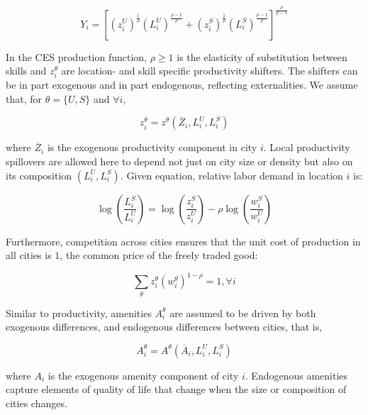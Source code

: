 \begin{equation}
  Y_i = \left[ (z_i^U)^{\frac{1}{\rho}} (L_i^U)^{\frac{\rho - 1}{\rho}} + (z_i^S)^{\frac{1}{\rho}} (L_i^S)^{\frac{\rho - 1}{\rho}} \right]^{\frac{\rho}{\rho - 1}}
\end{equation}

In the CES production function, $\rho \geq 1$ is the elasticity of substitution between skills and $z_i^{\theta}$ are location- and skill specific productivity shifters. The shifters can be in part exogenous and in part endogenous, reflecting externalities. We assume that, for $\theta = \{U, S\}$ and $\forall i$,

\begin{equation}
  z_i^{\theta} = z^{\theta}(\overline{Z}_i, L_i^U, L_i^S) 
\end{equation}

where $\overline{Z}_i$ is the exogenous productivity component in city $i$. Local productivity spillovers are allowed here to depend not just on city size or density but also on its composition $(L_i^U, L_i^S)$. Given equation, relative labor demand in location $i$ is:

\begin{equation}
  \log (\frac{L_i^S}{L_i^U}) = \log (\frac{z_i^S}{z_i^U}) - \rho \log(\frac{w_i^S}{w_i^U}) 
\end{equation}

Furthermore, competition across cities ensures that the unit cost of production in all cities is $1$, the common price of the freely traded good:

\begin{equation*}
  \sum_{\theta} z_i^{\theta} (w_i^{\theta})^{1 - \rho} = 1, \forall i
\end{equation*}

Similar to productivity, amenities $A_i^{\theta}$ are assumed to be driven by both exogenous differences, and endogenous differences between cities, that is,

\begin{equation}
  A_i^{\theta} = A^{\theta}(\overline{A}_i, L_i^U, L_i^S)
\end{equation}

where $A_i$ is the exogenous amenity component of city $i$. Endogenous amenities capture elements of quality of life that change when the size or composition of cities changes.

